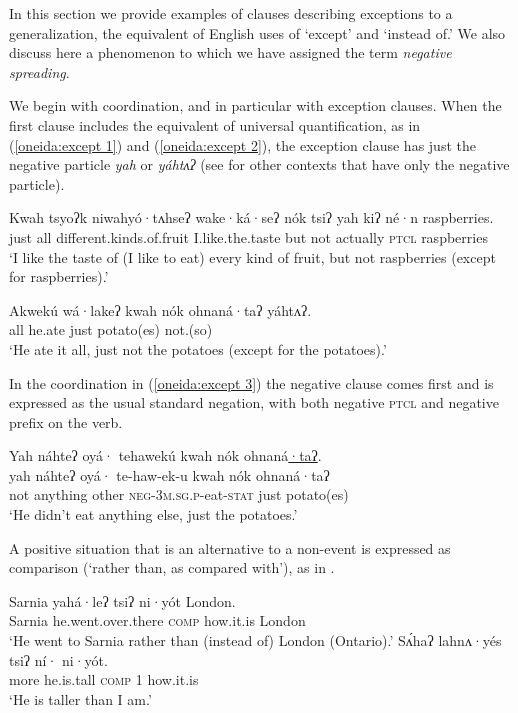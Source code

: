 \documentclass[output=paper,colorlinks,citecolor=brown]{langscibook}
\begin{document}
In this section we provide examples of clauses describing exceptions to a generalization, the equivalent of English uses of `except' and `instead of.' We also discuss here a phenomenon to which we have assigned the term \textit{negative spreading}.

We begin with coordination, and in particular with exception clauses. When the first clause includes the equivalent of universal quantification, as in (\ref{oneida:except 1}) and (\ref{oneida:except 2}), the exception clause has just the negative particle \textit{yah} or \textit{yáhtʌʔ} (see  for other contexts that have only the negative particle).

\ea\label{oneida:except 1}
    \gll Kwah tsyoʔk niwahy\'o·tʌhseʔ wake·ká·seʔ  {n\'ok tsiʔ} yah kiʔ né·n raspberries. \\
    just all {different.kinds.of.fruit} {I.like.the.taste} but not actually \textsc{ptcl} raspberries \\
    \glt `I like the taste of (I like to eat) every kind of fruit, but not raspberries (except for raspberries).' 
\z

\ea\label{oneida:except 2}
    \gll Akwekú wá·lakeʔ  {kwah n\'ok} ohnaná·taʔ yáhtʌʔ. \\
    all {he.ate} just potato(es) {not.(so)} \\
    \glt `He ate it all, just not the potatoes (except for the potatoes).' 
\z

In the coordination in (\ref{oneida:except 3}) the negative clause comes first and is expressed as the usual standard negation, with both negative \textsc{ptcl} and negative prefix on the verb.

\ea\label{oneida:except 3}
    \glll Yah náhteʔ oyá· tehawekú  {kwah n\'ok} ohnaná\uline{·taʔ}. \\
    yah náhteʔ oyá· te-haw-ek-u {kwah n\'ok}  ohnaná·taʔ \\
    not anything other \textsc{neg-3m.sg.p}-eat-\textsc{stat} just  potato(es) \\
    \glt `He didn't eat anything else, just the potatoes.'  
\z

A positive situation that is an alternative to a non-event is expressed as comparison (`rather than, as compared with'), as in .

\begin{exe}
\ex\label{oneida:comparison}
    \begin{xlist}
    \ex\label{oneida:comparison 1}
        \gll Sarnia yahá·leʔ tsiʔ ni·y\'ot London. \\
        Sarnia {he.went.over.there} \textsc{comp} {how.it.is} London \\
        \glt `He went to Sarnia rather than (instead of) London (Ontario).' 
    \ex\label{oneida:comparison 2}
        \gll Sʌ́haʔ lahnʌ·yés tsiʔ ní· ni·y\'ot. \\
         more {he.is.tall} \textsc{comp} \textsc{1} {how.it.is} \\
        \glt `He is taller than I am.' 
    \end{xlist}
\end{exe}
\end{document}
